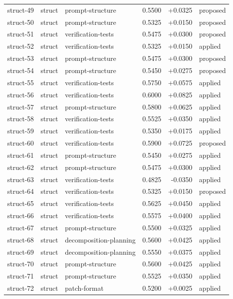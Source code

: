 \begin{center}
\begin{longtable}{llp{5.2cm}rrl}
struct-49 & struct & prompt-structure & 0.5500 & +0.0325 & proposed \\
struct-50 & struct & prompt-structure & 0.5325 & +0.0150 & proposed \\
struct-51 & struct & verification-tests & 0.5475 & +0.0300 & proposed \\
struct-52 & struct & verification-tests & 0.5325 & +0.0150 & applied \\
struct-53 & struct & prompt-structure & 0.5475 & +0.0300 & proposed \\
struct-54 & struct & prompt-structure & 0.5450 & +0.0275 & proposed \\
struct-55 & struct & verification-tests & 0.5750 & +0.0575 & applied \\
struct-56 & struct & verification-tests & 0.6000 & +0.0825 & applied \\
struct-57 & struct & prompt-structure & 0.5800 & +0.0625 & applied \\
struct-58 & struct & verification-tests & 0.5525 & +0.0350 & applied \\
struct-59 & struct & verification-tests & 0.5350 & +0.0175 & applied \\
struct-60 & struct & verification-tests & 0.5900 & +0.0725 & proposed \\
struct-61 & struct & prompt-structure & 0.5450 & +0.0275 & applied \\
struct-62 & struct & prompt-structure & 0.5475 & +0.0300 & applied \\
struct-63 & struct & verification-tests & 0.4825 & -0.0350 & applied \\
struct-64 & struct & verification-tests & 0.5325 & +0.0150 & proposed \\
struct-65 & struct & verification-tests & 0.5625 & +0.0450 & applied \\
struct-66 & struct & verification-tests & 0.5575 & +0.0400 & applied \\
struct-67 & struct & prompt-structure & 0.5500 & +0.0325 & applied \\
struct-68 & struct & decomposition-planning & 0.5600 & +0.0425 & applied \\
struct-69 & struct & decomposition-planning & 0.5550 & +0.0375 & applied \\
struct-70 & struct & prompt-structure & 0.5600 & +0.0425 & applied \\
struct-71 & struct & prompt-structure & 0.5525 & +0.0350 & applied \\
struct-72 & struct & patch-format & 0.5200 & +0.0025 & applied \\

\end{longtable}
\end{center}
